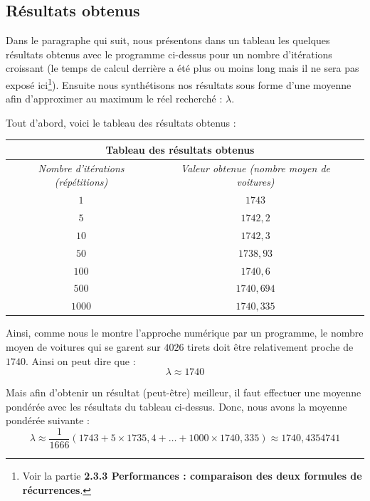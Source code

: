 \documentclass[a4paper,francais,11pt]{article}
\begin{document}
\subsection{Résultats obtenus}
Dans le paragraphe qui suit, nous présentons dans un tableau les quelques résultats obtenus avec le programme ci-dessus pour un nombre d'itérations croissant (le temps de calcul derrière a été plus ou moins long mais il ne sera pas exposé ici\footnote{Voir la partie \textbf{2.3.3
Performances : comparaison des deux formules de récurrences}.}). Ensuite nous synthétisons nos résultats sous forme d'une moyenne afin d'approximer au maximum le réel recherché : $\lambda$.

Tout d'abord, voici le tableau des résultats obtenus :
\begin{center}
\begin{tabular}{|c||c|c|}
    \hline
    \multicolumn{2}{|c|}{\textbf{Tableau des résultats obtenus}} \\ \hline\hline
        \multirow{1}{*}{\emph{Nombre d'itérations (répétitions)}} & \emph{Valeur obtenue (nombre moyen de voitures)} \\ \hline\hline
        \multirow{1}{*}{$1$} & $1743$ \\ \hline
        \multirow{1}{*}{$5$} & $1742{,}2$ \\ \hline
        \multirow{1}{*}{$10$} & $1742{,}3$ \\ \hline
        \multirow{1}{*}{$50$} & $1738{,}93$ \\ \hline
        \multirow{1}{*}{$100$} & $1740{,}6$\\ \hline
        \multirow{1}{*}{$500$} & $1740{,}694$ \\ \hline
        \multirow{1}{*}{$1000$} & $1740{,}335$ \\
    \hline
\end{tabular}
\end{center}

Ainsi, comme nous le montre l'approche numérique par un programme, le nombre moyen de voitures qui se garent sur $4026$ tirets doit être relativement proche de $1740$. Ainsi on peut dire que :
\[\lambda \approx 1740\]

Mais afin d'obtenir un résultat (peut-être) meilleur, il faut effectuer une moyenne pondérée avec les résultats du tableau ci-dessus. Donc, nous avons la moyenne pondérée suivante :
\[\lambda\approx\frac{1}{1666}\left(1743+5\times1735{,}4+\ldots+1000\times1740{,}335\right)\approx1740{,}4354741\]
\end{document}
